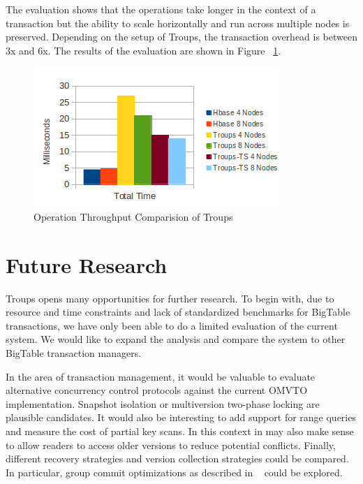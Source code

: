 \documentclass[10pt,final,journal]{IEEEtran}
\begin{document}
The evaluation shows that the operations take longer in the context of a transaction but the ability to scale horizontally and run across multiple nodes is preserved.  Depending on the setup of Troups, the transaction overhead is between 3x and 6x.  The results of the evaluation are shown in Figure ~\ref{tp}. 

\begin{figure}[!t]
\centering
\hspace*{-.2in}
\includegraphics[scale=0.7]{images/throughput.png}
\caption{Operation Throughput Comparision of Troups}
\label{tp}
\end{figure}

\section{Future Research}
Troups opens many opportunities for further research. To begin with, due to resource and time constraints and lack of standardized benchmarks for BigTable transactions, we have only been able to do a limited evaluation of the current system. We would like to expand the analysis and compare the system to other BigTable transaction managers.

In the area of transaction management, it would be valuable to evaluate alternative concurrency control protocols against the current OMVTO implementation. Snapshot isolation or multiversion two-phase locking are plausible candidates. It would also be interesting to add support for range queries and measure the cost of partial key scans. In this context in may also make sense to allow readers to access older versions to reduce potential conflicts. Finally, different recovery strategies and version collection strategies could be compared. In particular, group commit optimizations as described in ~\cite{Weikum:2001:TIS} could be explored.
\end{document}

